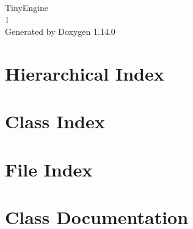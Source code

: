 \documentclass[twoside]{book}
\newcommand{\+}{\discretionary{\mbox{\scriptsize$\hookleftarrow$}}{}{}}
\newcommand{\clearemptydoublepage}{%
    \newpage{\pagestyle{empty}\cleardoublepage}%
  }
\begin{document}
  \raggedbottom
    \hypersetup{pageanchor=false,
                bookmarksnumbered=true,
                pdfencoding=unicode
               }
  \begin{titlepage}
  \vspace*{7cm}
  \begin{center}%
  {\Large Tiny\+Engine}\\
  [1ex]\large 1 \\
  \vspace*{1cm}
  {\large Generated by Doxygen 1.14.0}\\
  \end{center}
  \end{titlepage}
  \clearemptydoublepage
  \tableofcontents
  \clearemptydoublepage
  \hypersetup{pageanchor=true}
\chapter{Hierarchical Index}

\chapter{Class Index}

\chapter{File Index}

\chapter{Class Documentation}






































\end{document}
